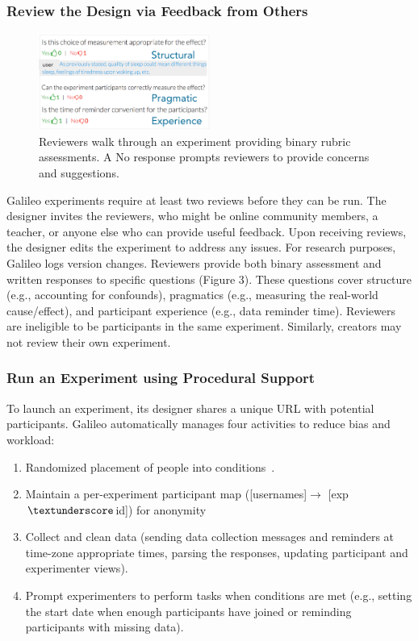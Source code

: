 \subsubsection{Review the Design via Feedback from Others}
\begin{figure}
  \centering
  \includegraphics[width=0.5\textwidth]{figures/galileo/galileo-2-review}
  \caption[Reviewers walk through an experiment providing binary rubric assessments]
{Reviewers walk through an experiment providing binary rubric assessments. A No response prompts reviewers to provide concerns and suggestions.}
  \label{fig:galileo-2-review}
\end{figure}
Galileo experiments require at least two reviews before they can be run. The designer invites the reviewers, who might be online community members, a teacher, or anyone else who can provide useful feedback. Upon receiving reviews, the designer edits the experiment to address any issues. For research purposes, Galileo logs version changes. Reviewers provide both binary assessment and written responses to specific questions (Figure 3). These questions cover structure (e.g., accounting for confounds), pragmatics (e.g., measuring the real-world cause/effect), and participant experience (e.g., data reminder time). Reviewers are ineligible to be participants in the same experiment. Similarly, creators may not review their own experiment. 

\subsubsection{Run an Experiment using Procedural Support}
To launch an experiment, its designer shares a unique URL with potential participants. Galileo automatically manages four activities to reduce bias and workload:
\begin{enumerate}
\item Randomized placement of people into conditions~\cite{Martin2007}.
\item Maintain a per-experiment participant map ([usernames]$\rightarrow$ [exp$\textunderscore$id]) for anonymity
\item Collect and clean data (sending data collection messages and reminders at time-zone appropriate times, parsing the responses, updating participant and experimenter views). 
\item Prompt experimenters to perform tasks when conditions are met (e.g., setting the start date when enough participants have joined or reminding participants with missing data). 
\end{enumerate}

